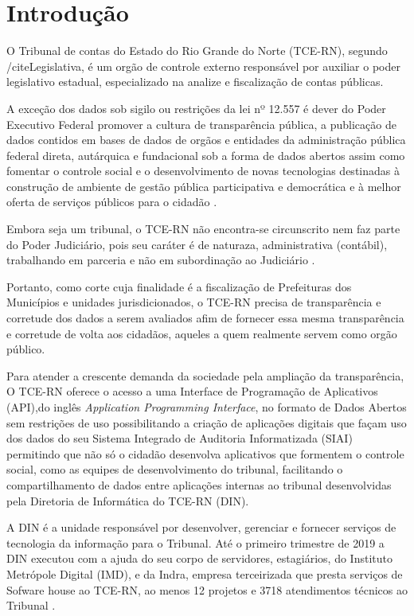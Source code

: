 \chapter[Introdução]{Introdução}
\label{ch:introducao}

O Tribunal de contas do Estado do Rio Grande do Norte (TCE-RN), segundo /cite{Legislativa}, é um orgão de controle externo responsável por auxiliar o poder legislativo estadual, especializado na analize e fiscalização de contas públicas.

A exceção dos dados sob sigilo ou restrições da lei nº 12.557 \cite{lei_12527} é dever do Poder Executivo Federal promover a cultura de transparência pública, a publicação de dados contidos em bases de dados de orgãos e entidades da administração pública federal direta, autárquica e fundacional sob a forma de dados abertos assim como fomentar o controle social e o desenvolvimento de novas tecnologias destinadas à construção de ambiente de gestão pública participativa e democrática e à melhor oferta de serviços públicos para o cidadão \cite{dec_8777}.

Embora seja um tribunal, o TCE-RN não encontra-se circunscrito nem faz parte do Poder Judiciário, pois seu caráter é de naturaza, administrativa (contábil), trabalhando em parceria e não em subordinação ao Judiciário \cite{barreto_tribunais}.

Portanto, como corte cuja finalidade é a fiscalização de Prefeituras dos Municípios e unidades jurisdicionados, o TCE-RN precisa de transparência e corretude dos dados a serem avaliados afim de fornecer essa mesma transparência e corretude de volta aos cidadãos, aqueles a quem realmente servem como orgão público.

Para atender a crescente demanda da sociedade pela ampliação da transparência, O TCE-RN oferece o acesso a uma Interface de Programação de Aplicativos (API),do inglês \textit{Application Programming Interface}, no formato de Dados Abertos sem restrições de uso possibilitando a criação de aplicações digitais \cite{dados_abertos_tcern} que façam uso dos dados do seu Sistema Integrado de Auditoria Informatizada (SIAI) permitindo que não só o cidadão desenvolva aplicativos que formentem o controle social, como as equipes de desenvolvimento do tribunal, facilitando o compartilhamento de dados entre aplicações internas ao tribunal desenvolvidas pela Diretoria de Informática do TCE-RN (DIN).

A DIN é a unidade responsável por desenvolver, gerenciar e fornecer serviços de tecnologia da informação para o Tribunal. Até o primeiro trimestre de 2019 a DIN executou com a ajuda do seu corpo de servidores, estagiários, do Instituto Metrópole Digital (IMD), e da Indra, empresa terceirizada que presta serviços de Sofware house ao TCE-RN, ao menos 12 projetos e 3718 atendimentos técnicos ao Tribunal \cite{relatorio_trimestral}.

